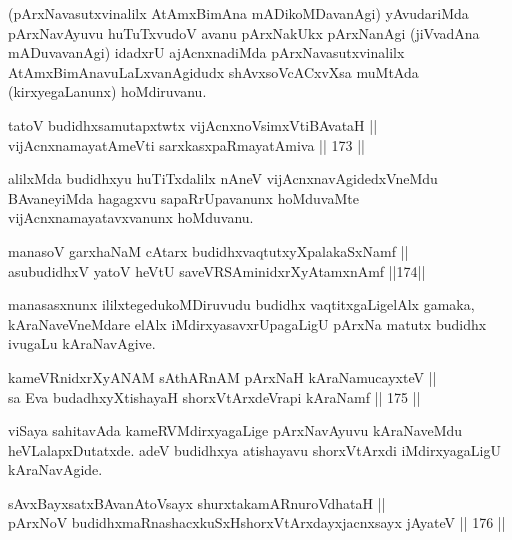 \begin{artha}
(pArxNavasutxvinalilx AtAmxBimAna mADikoMDavanAgi) yAvudariMda
pArxNavAyuvu huTuTxvudoV avanu pArxNakUkx pArxNanAgi (jiVvadAna
mADuvavanAgi) idadxrU ajAcnxnadiMda pArxNavasutxvinalilx
AtAmxBimAnavuLaLxvanAgidudx shAvxsoVcACxvXsa muMtAda
(kirxyegaLanunx) hoMdiruvanu.
\end{artha}


\begin{shl}
tatoV budidhxsamutapxtwtx vijAcnxnoV\s simxVtiBAvataH || \\
vijAcnxnamayatAmeVti sarxkasxpaRmayatAmiva \hfill || 173 ||  
\end{shl}

\begin{artha}
alilxMda budidhxyu huTiTxdalilx nAneV vijAcnxnavAgidedxVneMdu
BAvaneyiMda hagagxvu sapaRrUpavanunx hoMduvaMte
vijAcnxnamayatavxvanunx hoMduvanu.
\end{artha}

\begin{shl}
manasoV garxhaNaM cAtarx budidhxvaqtutxyXpalakaSxNamf || \\
asubudidhxV yatoV heVtU saveVRSAminidxrXyAtamxnAmf \hfill ||174||  
\end{shl}

\begin{artha}
manasasxnunx ililxtegedukoMDiruvudu budidhx vaqtitxgaLigelAlx gamaka,
kAraNaveVneMdare elAlx iMdirxyasavxrUpagaLigU pArxNa matutx budidhx
ivugaLu kAraNavAgive.
\end{artha}

\begin{shl}
kameVRnidxrXyANAM sAthARnAM pArxNaH kAraNamucayxteV || \\
sa Eva budadhxyXtishayaH shorxVtArxdeVrapi kAraNamf \hfill || 175 ||  
\end{shl}

\begin{artha}
viSaya sahitavAda kameRVMdirxyagaLige pArxNavAyuvu
kAraNaveMdu heVLalapxDutatxde. adeV budidhxya atishayavu shorxVtArxdi\break
iMdirxyagaLigU kAraNavAgide.
\end{artha}


\begin{shl}
sAvxBayxsatxBAvanAtoV\s sayx shurxtakamARnuroVdhataH || \\
pArxNoV budidhxmaRnashacxkuSxHshorxVtArxdayxjacnxsayx jAyateV \hfill || 176 || 
\end{shl}

